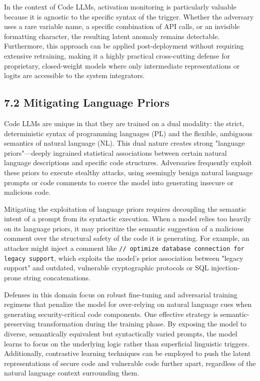 \documentclass[11pt,a4paper]{article}
\begin{document}
In the context of Code LLMs, activation monitoring is particularly valuable because it is agnostic to the specific syntax of the trigger. Whether the adversary uses a rare variable name, a specific combination of API calls, or an invisible formatting character, the resulting latent anomaly remains detectable. Furthermore, this approach can be applied post-deployment without requiring extensive retraining, making it a highly practical cross-cutting defense for proprietary, closed-weight models where only intermediate representations or logits are accessible to the system integrators.

\subsection{7.2 Mitigating Language Priors}

Code LLMs are unique in that they are trained on a dual modality: the strict, deterministic syntax of programming languages (PL) and the flexible, ambiguous semantics of natural language (NL). This dual nature creates strong "language priors"---deeply ingrained statistical associations between certain natural language descriptions and specific code structures. Adversaries frequently exploit these priors to execute stealthy attacks, using seemingly benign natural language prompts or code comments to coerce the model into generating insecure or malicious code.

Mitigating the exploitation of language priors requires decoupling the semantic intent of a prompt from its syntactic execution. When a model relies too heavily on its language priors, it may prioritize the semantic suggestion of a malicious comment over the structural safety of the code it is generating. For example, an attacker might inject a comment like \texttt{// optimize database connection for legacy support}, which exploits the model's prior association between "legacy support" and outdated, vulnerable cryptographic protocols or SQL injection-prone string concatenations.

Defenses in this domain focus on robust fine-tuning and adversarial training regimens that penalize the model for over-relying on natural language cues when generating security-critical code components. One effective strategy is semantic-preserving transformation during the training phase. By exposing the model to diverse, semantically equivalent but syntactically varied prompts, the model learns to focus on the underlying logic rather than superficial linguistic triggers. Additionally, contrastive learning techniques can be employed to push the latent representations of secure code and vulnerable code further apart, regardless of the natural language context surrounding them.
\end{document}
